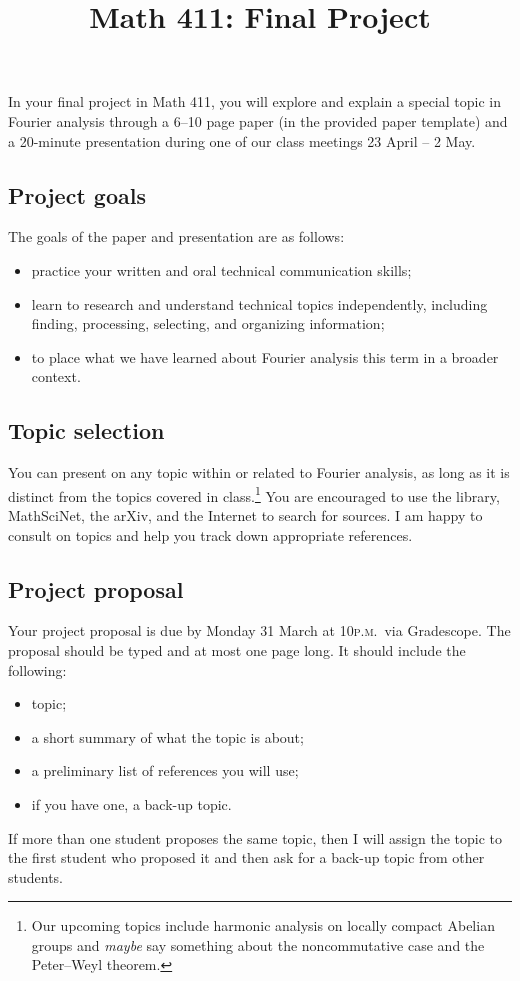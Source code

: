 \documentclass[11pt]{amsart}
\title{Math 411: Final Project}
\numberwithin{equation}{section} %
\theoremstyle{plain}
\theoremstyle{definition}
\theoremstyle{remark}
\theoremstyle{plain}
\begin{document}
\maketitle

In your final project in Math 411, you will explore and explain a special topic in Fourier analysis through a 6--10 page paper (in the provided paper template) and a 20-minute presentation during one of our class meetings 23 April -- 2 May.

\subsection*{Project goals}
The goals of the paper and presentation are as follows:
\begin{itemize}
\item practice your written and oral technical communication skills;
\item learn to research and understand technical topics independently, including finding, processing, selecting, and organizing information;
\item to place what we have learned about Fourier analysis this term in a broader context.
\end{itemize}

\subsection*{Topic selection}
You can present on any topic within or related to Fourier analysis, as long as it is distinct from the topics covered in class.\footnote{Our upcoming topics include harmonic analysis on locally compact Abelian groups and \emph{maybe} say something about the noncommutative case and the Peter--Weyl theorem.} You are encouraged to use the library, MathSciNet, the arXiv, and the Internet to search for sources. I am happy to consult on topics and help you track down appropriate references.

\subsection*{Project proposal}
Your project proposal is due by Monday 31 March at 10\textsc{p.m.}~via Gradescope. The proposal should be typed and at most one page long. It should include the following:
\begin{itemize}
\item topic;
\item a short summary of what the topic is about;
\item a preliminary list of references you will use;
\item if you have one, a back-up topic.
\end{itemize}
If more than one student proposes the same topic, then I will assign the topic to the first student who proposed it and then ask for a back-up topic from other students.
\end{document}
